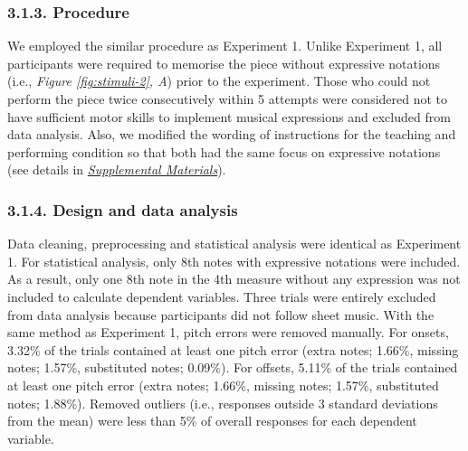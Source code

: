 \documentclass[
  english,
  man,floatsintext]{apa6}
\begin{document}
\hypertarget{procedure-2}{%
\subsubsection{3.1.3. Procedure}\label{procedure-2}}

We employed the similar procedure as Experiment 1. Unlike Experiment 1, all participants were required to memorise the piece without expressive notations (i.e., \emph{Figure \ref{fig:stimuli-2}, A}) prior to the experiment. Those who could not perform the piece twice consecutively within 5 attempts were considered not to have sufficient motor skills to implement musical expressions and excluded from data analysis. Also, we modified the wording of instructions for the teaching and performing condition so that both had the same focus on expressive notations (see details in \emph{\protect\hyperlink{supplemental}{Supplemental Materials}}).

\hypertarget{design-and-data-analysis-1}{%
\subsubsection{3.1.4. Design and data analysis}\label{design-and-data-analysis-1}}

Data cleaning, preprocessing and statistical analysis were identical as Experiment 1. For statistical analysis, only 8th notes with expressive notations were included. As a result, only one 8th note in the 4th measure without any expression was not included to calculate dependent variables. Three trials were entirely excluded from data analysis because participants did not follow sheet music. With the same method as Experiment 1, pitch errors were removed manually. For onsets, 3.32\% of the trials contained at least one pitch error (extra notes; 1.66\%, missing notes; 1.57\%, substituted notes; 0.09\%). For offsets, 5.11\% of the trials contained at least one pitch error (extra notes; 1.66\%, missing notes; 1.57\%, substituted notes; 1.88\%). Removed outliers (i.e., responses outside 3 standard deviations from the mean) were less than 5\% of overall responses for each dependent variable.
\end{document}
